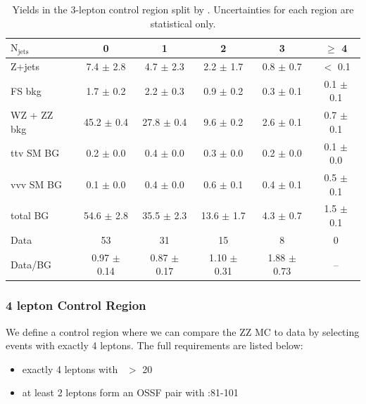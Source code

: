 \begin{table}[htb]
  \scriptsize
  \begin{center}
    \caption{\label{tab:njets_CR3lep} 
      Yields in the 3-lepton control region split by \nj. Uncertainties for each region are statistical only. 
    }
    \begin{tabular}{l|c|c|c|c|c}
      \hline
      \hline
      $\mathrm{N_{jets}}$ &0  & 1  & 2  & 3  & $\geq$ 4 \\
      \hline 
      Z+jets&  7.4 $\pm$ 2.8 &  4.7 $\pm$ 2.3 &  2.2 $\pm$ 1.7 &  0.8 $\pm$ 0.7 &  $<$ 0.1 \\ 
      FS bkg&  1.7 $\pm$ 0.2 &  2.2 $\pm$ 0.3 &  0.9 $\pm$ 0.2 &  0.3 $\pm$ 0.1 &  0.1 $\pm$ 0.1 \\ 
      WZ + ZZ bkg&  45.2 $\pm$ 0.4 &  27.8 $\pm$ 0.4 &  9.6 $\pm$ 0.2 &  2.6 $\pm$ 0.1 &  0.7 $\pm$ 0.1 \\ 
      ttv SM BG&  0.2 $\pm$ 0.0 &  0.4 $\pm$ 0.0 &  0.3 $\pm$ 0.0 &  0.2 $\pm$ 0.0 &  0.1 $\pm$ 0.0 \\ 
      vvv SM BG&  0.1 $\pm$ 0.0 &  0.4 $\pm$ 0.0 &  0.6 $\pm$ 0.1 &  0.4 $\pm$ 0.1 &  0.5 $\pm$ 0.1 \\ 
      \hline 
      total BG&  54.6 $\pm$ 2.8 &  35.5 $\pm$ 2.3 &  13.6 $\pm$ 1.7 &  4.3 $\pm$ 0.7 &  1.5 $\pm$ 0.1 \\ 
      \hline 
      Data&  53 &  31 &  15 &  8 &  0 \\ 
      \hline 
      Data/BG&  0.97 $\pm$ 0.14 &  0.87 $\pm$ 0.17 &  1.10 $\pm$ 0.31 &  1.88 $\pm$ 0.73 &  -- \\ 
      \hline
      \hline
    \end{tabular}
  \end{center}
\end{table}


\subsubsection{4 lepton Control Region}
\label{sec:bkg_ZZ}


We define a control region where we can compare the ZZ MC to data by selecting events with exactly 4 leptons.
The full requirements are listed below:

\begin{itemize}
\item exactly 4 leptons with \pt\ $>$ 20 \gev
\item at least 2 leptons form an OSSF pair with \mll:81-101 \gev
\end{itemize}

